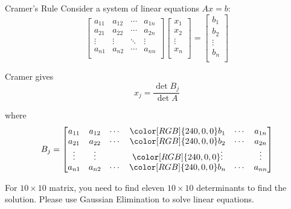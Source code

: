 \documentclass{beamer}
\begin{document}
\begin{frame}{Cramer's Rule}
Consider a system of linear equations $Ax=b$:
\begin{equation*}
    \left[ \begin{matrix}
        a_{11}&		a_{12}&		\cdots&		a_{1n}\\
        a_{21}&		a_{22}&		\cdots&		a_{2n}\\
        \vdots&		\vdots&		\ddots&		\vdots\\
        a_{n1}&		a_{n2}&		\cdots&		a_{nn}\\
    \end{matrix} \right] \left[ \begin{array}{c}
        x_1\\
        x_2\\
        \vdots\\
        x_n\\
    \end{array} \right] =\left[ \begin{array}{c}
        b_1\\
        b_2\\
        \vdots\\
        b_n\\
    \end{array} \right]
\end{equation*}

Cramer gives
\begin{equation*}
    x_j=\frac{\det B_j}{\det A}
\end{equation*}

where
\begin{equation*}
    B_j=\left[ \begin{matrix}
        a_{11}&		a_{12}&		\cdots&		{\color[RGB]{240, 0, 0} b_1}&		\cdots&		a_{1n}\\
        a_{21}&		a_{22}&		\cdots&		{\color[RGB]{240, 0, 0} b_2}&		\cdots&		a_{2n}\\
        \vdots&		\vdots&		&		{\color[RGB]{240, 0, 0} \vdots }&		&		\vdots\\
        a_{n1}&		a_{n2}&		\cdots&		{\color[RGB]{240, 0, 0} b_n}&		\cdots&		a_{nn}\\
    \end{matrix} \right]
\end{equation*}

For $10\times 10$ matrix, you need to find eleven $10\times 10$ determinants to find the solution. Please use Gaussian Elimination to solve linear equations.
\end{frame}
\end{document}
